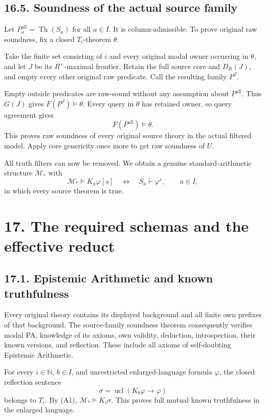 \documentclass[
  11pt,
  letterpaper,
]{article}
\begin{document}
\subsection{16.5. Soundness of the actual source
family}\label{soundness-of-the-actual-source-family}

Let \(P^{\mathrm{all}}_a=\operatorname{Th}(S_a)\) for all \(a\in I\). It
is column-admissible. To prove original raw soundness, fix a closed
\(T_i\)-theorem \(\theta\).

Take the finite set consisting of \(i\) and every original modal owner
occurring in \(\theta\), and let \(J\) be its \(R^+\)-maximal frontier.
Retain the full source core and \(D_R(J)\), and empty every other
original raw predicate. Call the resulting family \(P^J\).

Empty outside predicates are raw-sound without any assumption about
\(P^{\mathrm{all}}\). Thus \(G(J)\) gives \(F(P^J)\models\theta\). Every
query in \(\theta\) has retained owner, so query agreement gives \[
F(P^{\mathrm{all}})\models\theta.
\] This proves raw soundness of every original source theory in the
actual filtered model. Apply core genericity once more to get raw
soundness of \(U\).

All truth filters can now be removed. We obtain a genuine
standard-arithmetic structure \(\mathcal M_*\) with \[
\mathcal M_*\models K_a\varphi[s]
\quad\Longleftrightarrow\quad
S_a\vdash\varphi^s,
\qquad a\in I,
\tag{A1}
\] in which every source theorem is true.

\section{17. The required schemas and the effective
reduct}\label{the-required-schemas-and-the-effective-reduct}

\subsection{17.1. Epistemic Arithmetic and known
truthfulness}\label{epistemic-arithmetic-and-known-truthfulness}

Every original theory contains its displayed background and all finite
own prefixes of that background. The source-family soundness theorem
consequently verifies modal PA, knowledge of its axioms, own validity,
deduction, introspection, their known versions, and reflection. These
include all axioms of self-doubting Epistemic Arithmetic.

For every \(i\in\mathbb N\), \(b\in I\), and unrestricted
enlarged-language formula \(\varphi\), the closed reflection sentence \[
\sigma=\operatorname{ucl}(K_b\varphi\to\varphi)
\] belongs to \(T_i\). By (A1), \(\mathcal M_*\models K_i\sigma\). This
proves full mutual known truthfulness in the enlarged language.
\end{document}
